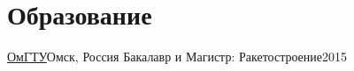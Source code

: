 \section{Образование}
\resumeSubHeadingListStart

\resumeSubheading
{\href{https://omgtu.ru/}{ОмГТУ}}{Омск, Россия}
{Бакалавр и Магистр: Ракетостроение}{2015}

\resumeSubHeadingListEnd
